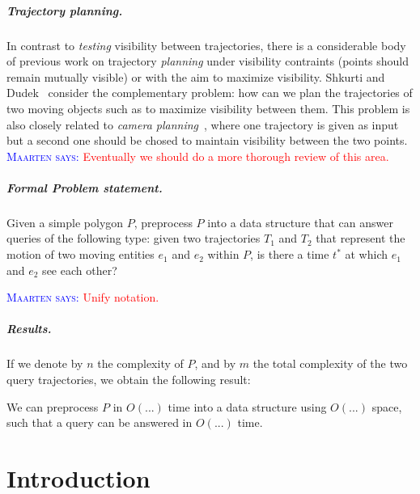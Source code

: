 \documentclass[a4paper, UKenglish]{paper}
\newcommand{\myremark}[4]{\textcolor{blue}{\textsc{#1 #2:}} \textcolor{#4}{\textsf{#3}}}
\newcommand{\maarten}[2][says]{\myremark{Maarten}{#1}{#2}{Red}}
\begin{document}
\subparagraph {Trajectory planning.}

In contrast to {\em testing} visibility between trajectories, there is a considerable body of previous work on trajectory {\em planning} under visibility contraints (points should remain mutually visible) or with the aim to maximize visibility.
Shkurti and Dudek~\cite {6907405} consider the complementary problem: how can we plan the trajectories of two moving objects such as to maximize visibility between them.
This problem is also closely related to {\em camera planning}~\cite {christie}, where one trajectory is given as input but a second one should be chosed to maintain visibility between the two points.
\maarten {Eventually we should do a more thorough review of this area.}


\subparagraph {Formal Problem statement.}

  Given a simple polygon $P$, preprocess $P$ into a data structure that can answer queries of the following type: given two trajectories $T_1$ and $T_2$ that represent the motion of two moving entities $e_1$ and $e_2$ within $P$, is there a time $t^*$ at which $e_1$ and $e_2$ see each other?
    
\maarten {Unify notation.}

\subparagraph {Results.}

  If we denote by $n$ the complexity of $P$, and by $m$ the total complexity of the two query trajectories, we obtain the following result:
  
  We can preprocess $P$ in $O(...)$ time into a data structure using $O(...)$ space, such that a query can be answered in $O(...)$ time.



\section{Introduction}
\end{document}
